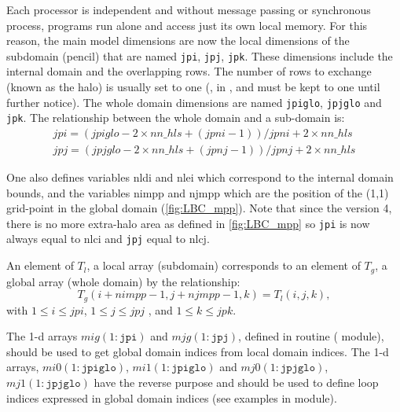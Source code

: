 \documentclass[../main/NEMO_manual]{subfiles}
\begin{document}
Each processor is independent and without message passing or synchronous process, programs run alone and access just its own local memory.
For this reason,
the main model dimensions are now the local dimensions of the subdomain (pencil) that are named \texttt{jpi}, \texttt{jpj}, \texttt{jpk}.
These dimensions include the internal domain and the overlapping rows.
The number of rows to exchange (known as the halo) is usually set to one (, in ,
and must be kept to one until further notice).
The whole domain dimensions are named \texttt{jpiglo}, \texttt{jpjglo} and \texttt{jpk}.
The relationship between the whole domain and a sub-domain is:
\begin{gather*}
  jpi = ( jpiglo-2\times nn\_hls + (jpni-1) ) / jpni + 2\times nn\_hls \\
  jpj = ( jpjglo-2\times nn\_hls + (jpnj-1) ) / jpnj + 2\times nn\_hls
\end{gather*}

One also defines variables nldi and nlei which correspond to the internal domain bounds, and the variables nimpp and njmpp which are the position of the (1,1) grid-point in the global domain (\autoref{fig:LBC_mpp}). Note that since the version 4, there is no more extra-halo area as defined in \autoref{fig:LBC_mpp} so \texttt{jpi} is now always equal to nlci and \texttt{jpj} equal to nlcj.

An element of $T_{l}$, a local array (subdomain) corresponds to an element of $T_{g}$,
a global array (whole domain) by the relationship:
\[
  T_{g} (i+nimpp-1,j+njmpp-1,k) = T_{l} (i,j,k),
\]
with $1 \leq i \leq jpi$, $1  \leq j \leq jpj $ , and  $1  \leq k \leq jpk$.

The 1-d arrays $mig(1:\texttt{jpi})$ and $mjg(1:\texttt{jpj})$, defined in  routine ( module), should be used to get global domain indices from local domain indices. The 1-d arrays, $mi0(1:\texttt{jpiglo})$, $mi1(1:\texttt{jpiglo})$ and $mj0(1:\texttt{jpjglo})$, $mj1(1:\texttt{jpjglo})$ have the reverse purpose and should be used to define loop indices expressed in global domain indices (see examples in  module).\\
\end{document}
